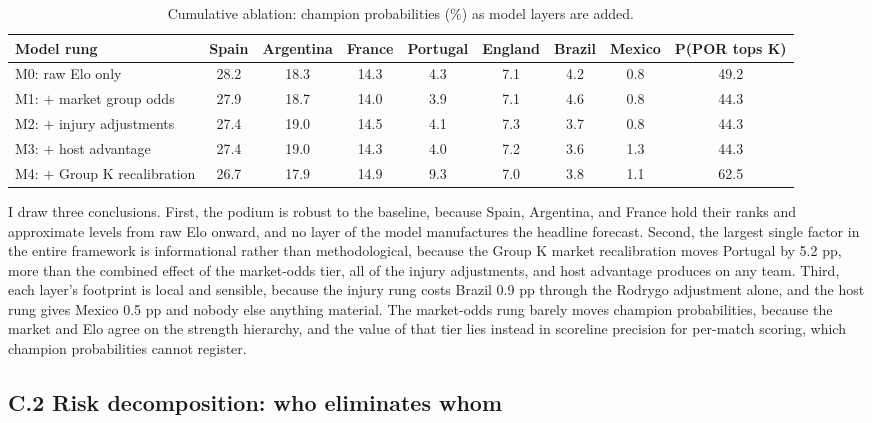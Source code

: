\documentclass[11pt,letterpaper]{article}
\begin{document}
\begin{table}[ht]
\centering\footnotesize
\caption{Cumulative ablation: champion probabilities (\%) as model layers are added.}
\label{tab:ablation}
\begin{tabular}{lcccccccc}
\toprule
Model rung & Spain & Argentina & France & Portugal & England & Brazil & Mexico & P(POR tops K) \\
\midrule
M0: raw Elo only          & 28.2 & 18.3 & 14.3 & 4.3 & 7.1 & 4.2 & 0.8 & 49.2 \\
M1: $+$ market group odds & 27.9 & 18.7 & 14.0 & 3.9 & 7.1 & 4.6 & 0.8 & 44.3 \\
M2: $+$ injury adjustments& 27.4 & 19.0 & 14.5 & 4.1 & 7.3 & 3.7 & 0.8 & 44.3 \\
M3: $+$ host advantage    & 27.4 & 19.0 & 14.3 & 4.0 & 7.2 & 3.6 & 1.3 & 44.3 \\
M4: $+$ Group K recalibration & 26.7 & 17.9 & 14.9 & 9.3 & 7.0 & 3.8 & 1.1 & 62.5 \\
\bottomrule
\end{tabular}
\end{table}

I draw three conclusions. First, the podium is robust to the baseline, because Spain, Argentina, and France hold their ranks and approximate levels from raw Elo onward, and no layer of the model manufactures the headline forecast. Second, the largest single factor in the entire framework is informational rather than methodological, because the Group K market recalibration moves Portugal by 5.2 pp, more than the combined effect of the market-odds tier, all of the injury adjustments, and host advantage produces on any team. Third, each layer's footprint is local and sensible, because the injury rung costs Brazil 0.9 pp through the Rodrygo adjustment alone, and the host rung gives Mexico 0.5 pp and nobody else anything material. The market-odds rung barely moves champion probabilities, because the market and Elo agree on the strength hierarchy, and the value of that tier lies instead in scoreline precision for per-match scoring, which champion probabilities cannot register.

\subsection*{C.2 \quad Risk decomposition: who eliminates whom}
\end{document}
